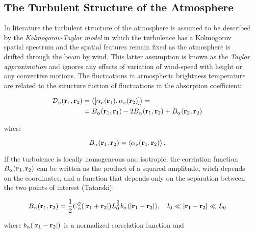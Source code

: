 \subsection{The Turbulent Structure of the Atmosphere}\label{ss:turbulent_structure}

In literature the turbulent structure of the atmosphere is assumed to be
described by the \emph{Kolmogorov-Taylor model} in which the turbulence has
a Kolmogorov spatial spectrum and the spatial features remain fixed as the
atmosphere is drifted through the beam by wind. This latter assumption is
known as the \emph{Taylor approximation} and ignores any effects of
variation of wind-speed with height or any convective motions.
The fluctuations in atmospheric brightness temperature are related to the
structure fuction of fluctuations in the absorption coefficient:

\begin{equation}
        \begin{split}
                \mathcal{D}_\alpha\qty(\vb{r}_1,\vb{r}_2) & =
                \expval{\qty[\alpha_\nu\qty(\vb{r}_1),\alpha_\nu\qty(\vb{r}_2)]} =
                \\
                & = B_\alpha\qty(\vb{r}_1,\vb{r}_1) -
                2B_\alpha\qty(\vb{r}_1,\vb{r}_2) + B_\alpha\qty(\vb{r}_2,\vb{r}_2)
        \end{split}
\end{equation}

where

\begin{equation}
        B_\alpha\qty(\vb{r}_1,\vb{r}_2) =
        \expval{\alpha_\nu\qty(\vb{r}_1,\vb{r}_2)}.
\end{equation}

If the turbolence is locally homogeneous and isotropic, the corrlation
function $B_\alpha\qty(\vb{r}_1,\vb{r}_2)$ can be written as the product of
a squared amplitude, witch depends on the coordinates, and a function that
depends only on the separation between the two points of interest (Tatarski):

\begin{equation}
        B_\alpha\qty(\vb{r}_1,\vb{r}_2) = \frac{1}{2}
        C^2_\alpha\qty(\abs{\vb{r}_1 + \vb{r}_2})
        L^{\frac{2}{3}}_0 b_\alpha\qty(\abs{\vb{r}_1 - \vb{r}_2}),\quad
        l_0 \ll \abs{\vb{r}_1 - \vb{r}_2} \ll L_0
\end{equation}

where $b_\alpha\qty(\abs{\vb{r}_1 - \vb{r}_2})$ is a normalized correlation
function and

